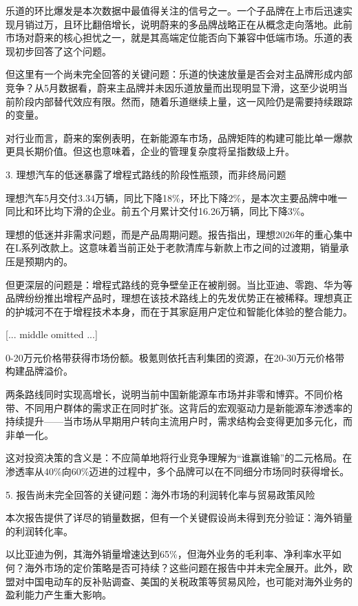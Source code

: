 \documentclass[11pt]{ctexart}
\begin{document}
乐道的环比爆发是本次数据中最值得关注的信号之一。一个子品牌在上市后迅速实现月销过万，且环比翻倍增长，说明蔚来的多品牌战略正在从概念走向落地。此前市场对蔚来的核心担忧之一，就是其高端定位能否向下兼容中低端市场。乐道的表现初步回答了这个问题。

但这里有一个尚未完全回答的关键问题：乐道的快速放量是否会对主品牌形成内部竞争？从5月数据看，蔚来主品牌并未因乐道放量而出现明显下滑，这至少说明当前阶段内部替代效应有限。然而，随着乐道继续上量，这一风险仍是需要持续跟踪的变量。

对行业而言，蔚来的案例表明，在新能源车市场，品牌矩阵的构建可能比单一爆款更具长期价值。但这也意味着，企业的管理复杂度将呈指数级上升。

3. 理想汽车的低迷暴露了增程式路线的阶段性瓶颈，而非终局问题

理想汽车5月交付3.34万辆，同比下降18\%，环比下降2\%，是本次主要品牌中唯一同比和环比均下滑的企业。前五个月累计交付16.26万辆，同比下降3\%。

理想的低迷并非需求问题，而是产品周期问题。报告指出，理想2026年的重心集中在L系列改款上。这意味着当前正处于老款清库与新款上市之间的过渡期，销量承压是预期内的。

但更深层的问题是：增程式路线的竞争壁垒正在被削弱。当比亚迪、零跑、华为等品牌纷纷推出增程产品时，理想在该技术路线上的先发优势正在被稀释。理想真正的护城河不在于增程技术本身，而在于其家庭用户定位和智能化体验的整合能力。

[... middle omitted ...]

0-20万元价格带获得市场份额。极氪则依托吉利集团的资源，在20-30万元价格带构建品牌溢价。

两条路线同时实现高增长，说明当前中国新能源车市场并非零和博弈。不同价格带、不同用户群体的需求正在同时扩张。这背后的宏观驱动力是新能源车渗透率的持续提升——当市场从早期用户转向主流用户时，需求结构会变得更加多元化，而非单一化。

这对投资决策的含义是：不应简单地将行业竞争理解为“谁赢谁输”的二元格局。在渗透率从40\%向60\%迈进的过程中，多个品牌可以在不同细分市场同时获得增长。

5. 报告尚未完全回答的关键问题：海外市场的利润转化率与贸易政策风险

本次报告提供了详尽的销量数据，但有一个关键假设尚未得到充分验证：海外销量的利润转化率。

以比亚迪为例，其海外销量增速达到65\%，但海外业务的毛利率、净利率水平如何？海外市场的定价策略是否可持续？这些问题在报告中并未完全展开。此外，欧盟对中国电动车的反补贴调查、美国的关税政策等贸易风险，也可能对海外业务的盈利能力产生重大影响。
\end{document}
